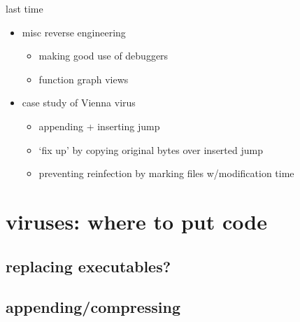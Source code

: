 \date{}
\title{}
\date{}

\begin{frame}
    \titlepage
\end{frame}



\begin{frame}{last time}
    \begin{itemize}
    \item misc reverse engineering
        \begin{itemize}
        \item making good use of debuggers
        \item function graph views
        \end{itemize}
    \item case study of Vienna virus
        \begin{itemize}
        \item appending + inserting jump
        \item `fix up' by copying original bytes over inserted jump
        \item preventing reinfection by marking files w/modification time
        \end{itemize}
    \end{itemize}
\end{frame}

\section{viruses: where to put code}



\subsection{replacing executables?}




\subsection{appending/compressing}





